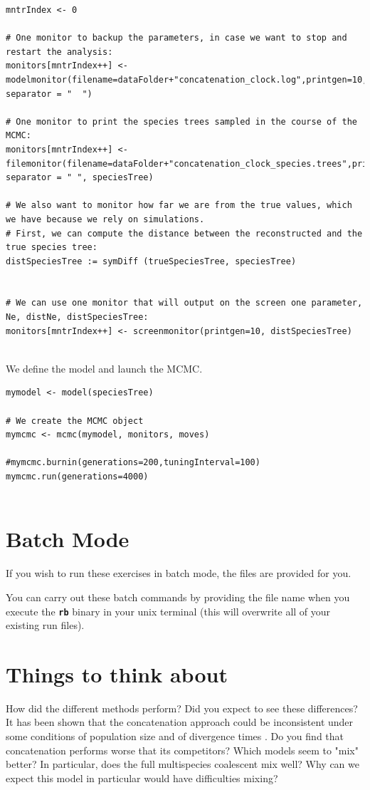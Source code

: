 \documentclass[11pt]{article}
\newcommand{\cl}[1]{{\texttt{\textbf{#1}}}}
\begin{document}
{\begin{framed}
{\begin{snugshade*}
\begin{lstlisting}
mntrIndex <- 0

# One monitor to backup the parameters, in case we want to stop and restart the analysis:
monitors[mntrIndex++] <- modelmonitor(filename=dataFolder+"concatenation_clock.log",printgen=10, separator = "	")

# One monitor to print the species trees sampled in the course of the MCMC:
monitors[mntrIndex++] <- filemonitor(filename=dataFolder+"concatenation_clock_species.trees",printgen=10, separator = "	", speciesTree)

# We also want to monitor how far we are from the true values, which we have because we rely on simulations.
# First, we can compute the distance between the reconstructed and the true species tree:
distSpeciesTree := symDiff (trueSpeciesTree, speciesTree)


# We can use one monitor that will output on the screen one parameter, Ne, distNe, distSpeciesTree:
monitors[mntrIndex++] <- screenmonitor(printgen=10, distSpeciesTree)
	
\end{lstlisting}
\end{snugshade*}}
We define the model and launch the MCMC.

 {\tt \begin{snugshade*}
\begin{lstlisting}
mymodel <- model(speciesTree)

# We create the MCMC object
mymcmc <- mcmc(mymodel, monitors, moves)

#mymcmc.burnin(generations=200,tuningInterval=100)
mymcmc.run(generations=4000)


\end{lstlisting}
\end{snugshade*}}

 \end{framed}}

\bigskip


\section{Batch Mode}

If you wish to run these exercises in batch mode, the files are provided for you. 

You can carry out these batch commands by providing the file name when you execute the \cl{rb} binary in your unix terminal (this will overwrite all of your existing run files).
\exs{\cl{\$ rb NameOfTheFile.Rev}}


\section{Things to think about}
How did the different methods perform? 
Did you expect to see these differences?
It has been shown that the concatenation approach could be inconsistent under some conditions of population size and of divergence times \citep{Degnan2006}. 
Do you find that concatenation performs worse that its competitors?
Which models seem to "mix" better?
In particular, does the full multispecies coalescent mix well?
Why can we expect this model in particular would have difficulties mixing?
\end{document}
